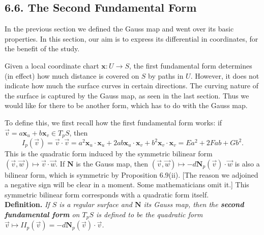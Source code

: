 \documentclass[leqno]{book}
\begin{document}
\subsection*{6.6. The Second Fundamental Form}
In the previous section we defined the Gauss map and went over its basic properties.  In this section, our aim is to express its differential in coordinates, for the benefit of the study.

Given a local coordinate chart $\mathbf x:U\to S$, the first fundamental form determines (in effect) how much distance is covered on $S$ by paths in $U$.  However, it does not indicate how much the surface curves in certain directions.  The curving nature of the surface is captured by the Gauss map, as seen in the last section.  Thus we would like for there to be another form, which has to do with the Gauss map.

To define this, we first recall how the first fundamental form works: if $\vec v=a\mathbf x_u+b\mathbf x_v\in T_pS$, then
$$I_p(\vec v)=\vec v\cdot\vec v=a^2\mathbf x_u\cdot\mathbf x_u+2ab\mathbf x_u\cdot\mathbf x_v+b^2\mathbf x_v\cdot\mathbf x_v=Ea^2+2Fab+Gb^2.$$
This is the quadratic form induced by the symmetric bilinear form $(\vec v,\vec w)\mapsto\vec v\cdot\vec w$.  If $\mathbf N$ is the Gauss map, then $(\vec v,\vec w)\mapsto -d\mathbf N_p(\vec v)\cdot\vec w$ is also a bilinear form, which is symmetric by Proposition 6.9(ii).  [The reason we adjoined a negative sign will be clear in a moment.  Some mathematicians omit it.]  This symmetric bilinear form corresponds with a quadratic form itself.\\

\noindent\textbf{Definition.} \emph{If $S$ is a regular surface and $\mathbf N$ its Gauss map, then the \textbf{second fundamental form} on $T_pS$ is defined to be the quadratic form $\vec v\mapsto I\!I_p(\vec v)=-d\mathbf N_p(\vec v)\cdot\vec v$.}\\ %
\end{document}
